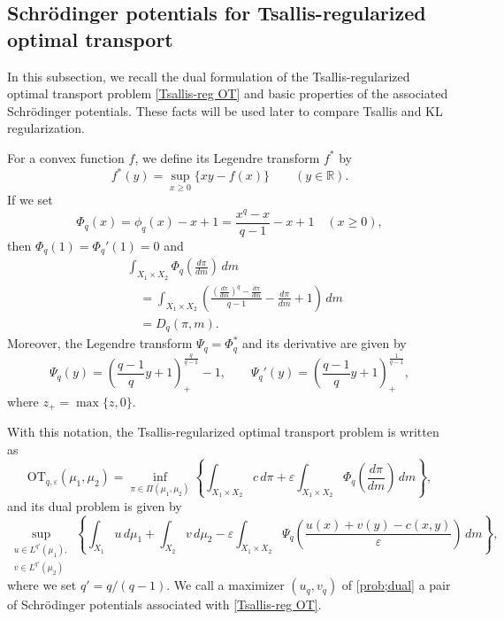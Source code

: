 \documentclass[a4paper,11pt]{article}
\theoremstyle{plain}
\theoremstyle{definition}
\theoremstyle{remark}
\theoremstyle{plain}
\numberwithin{equation}{section}
\newcommand{\R}{\mathbb R}
\newcommand{\ep}{\varepsilon}
\newcommand{\1}{\mbox{1}\hspace{-0.25em}\mbox{l}} %
\begin{document}
\subsection{Schr\"odinger potentials for Tsallis-regularized optimal transport}

In this subsection, we recall the dual formulation of the Tsallis-regularized optimal transport problem \eqref{Tsallis-reg OT} and basic properties of the associated Schr\"odinger potentials. These facts will be used later to compare Tsallis and KL regularization. 

For a convex function $f$, we define its Legendre transform $f^*$ by
\begin{equation*}
f^*(y) = \sup_{x \geq 0} \{x y - f(x)\}
\qquad (y \in \R).
\end{equation*}
If we set
\begin{equation*}
\Phi_q(x) = \phi_q(x)-x+1=\frac{x^q - x}{q - 1} - x + 1\quad (x \geq 0),
\end{equation*}
then $\Phi_q(1)=\Phi_q'(1)=0$ and
\begin{align*}
  &\int_{X_1 \times X_2} \Phi_q\left( \frac{d\pi}{dm} \right)\, dm \\
  &\quad = \int_{X_1 \times X_2} \left(\frac{\left(\frac{d\pi}{dm}\right)^q - \frac{d\pi}{dm}}{q - 1} - \frac{d\pi}{dm} + 1\right)\, dm \\
  &\quad %
  = D_q(\pi, m).
\end{align*}
Moreover, the Legendre transform $\Psi_q=\Phi_q^*$ and its derivative are given by
\begin{equation*}
\Psi_q(y) = \left(\frac{q-1}{q}y+1\right)_+^{\frac{q}{q-1}}-1, \qquad 
\Psi_q'(y) = \left(\frac{q-1}{q}y+1\right)_+^{\frac{1}{q-1}},
\end{equation*}
where $z_+ =\max\{z,0\}$. 

With this notation, the Tsallis-regularized optimal transport problem is written as
\begin{equation*}
\mathrm{OT}_{q, \ep}(\mu_1, \mu_2) = \inf_{\pi \in \Pi(\mu_1, \mu_2)}
\left\{ \int_{X_1 \times X_2} c\, d\pi + \ep \int_{X_1 \times X_2} \Phi_q\left( \frac{d\pi}{dm} \right)\, dm \right\},
\end{equation*}
and its dual problem is given by
\begin{equation}\label{prob;dual}
\sup_{\substack{u \in L^{q'}(\mu_1), \\ v \in L^{q'}(\mu_2)}}
\left\{
\int_{X_1} u\, d\mu_1
+ \int_{X_2} v\, d\mu_2
- \ep \int_{X_1 \times X_2}
\Psi_q\left( \frac{u(x) + v(y) - c(x,y)}{\ep} \right)\, dm
\right\},
\end{equation}
where we set $q' = q/(q - 1)$. 
We call a maximizer $(u_q, v_q)$ of \eqref{prob;dual} a pair of Schr\"odinger potentials associated with \eqref{Tsallis-reg OT}.
\end{document}
